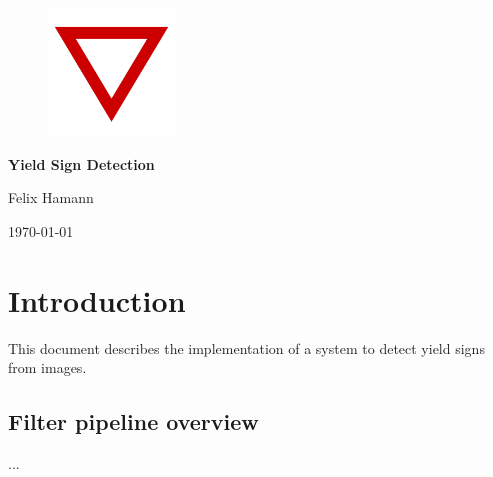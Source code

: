 \documentclass{report}
\begin{document}
%
%


{\centering

  \begin{figure}
    \vspace{3cm}

    \centering
    \includegraphics[width=0.3\textwidth]{src/yield}

    \vspace{4cm}
  \end{figure}


  {\Huge\textbf{Yield Sign Detection}}
  \vspace{.4cm}

  Felix Hamann

  \vspace{.2cm}

  \today

}


%
%

\tableofcontents


\chapter{Introduction}

This document describes the implementation of a system to detect yield
signs from images.

{}


\pagebreak
\section{Filter pipeline overview}
...
\end{document}
